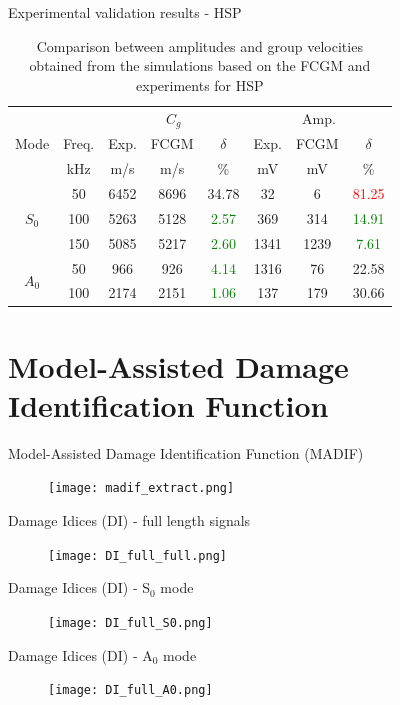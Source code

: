 \documentclass[10pt,aspectratio=169]{beamer} %
\begin{document}
\begin{frame}[label=frame16]{Experimental validation results - HSP}
	\begin{table}
		\centering
		\caption{\label{tab:group_velocity_hsp} Comparison between amplitudes and group velocities obtained from the simulations based on the FCGM and experiments for HSP}
		\begin{tabular}{cccccccc}
			\toprule
			& & \multicolumn{3}{c}{\(C_g\)} & \multicolumn{3}{c}{Amp.}\\
			Mode & Freq. & Exp. & FCGM & \(\delta\) & Exp. & FCGM & \(\delta\)\\
			& kHz & m/s & m/s & \% & mV & mV & \%\\
			\midrule
			\multirow{3}{*}{$S_0$} & 50 & 6452 & 8696 & {34.78}& 32 & 6 & \textcolor{red}{81.25}\\
			&100& 5263 & 5128 & \textcolor{green}{2.57}& 369 & 314 & \textcolor{green}{14.91}\\
			&150& 5085 & 5217 & \textcolor{green}{2.60}& 1341 & 1239 & \textcolor{green}{7.61}\\
			\midrule
			\multirow{2}{*}{$A_0$} & 50 & 966 & 926 & \textcolor{green}{4.14} & 1316& 76 & {22.58}\\
			& 100 & 2174 & 2151 & \textcolor{green}{1.06} & 137 & 179 & {30.66}\\
			\bottomrule
		\end{tabular}
	\end{table}
\end{frame}
\section{Model-Assisted Damage Identification Function}
\begin{frame}[label=frame17]{Model-Assisted Damage Identification Function (MADIF)}
\begin{figure}
	\texttt{[image: madif\_extract.png]}
	\label{fig:madif_ectract}
\end{figure}
\end{frame}

\begin{frame}[label=frame17]{Damage Idices (DI) - full length signals}
	\begin{figure}
		\texttt{[image: DI\_full\_full.png]}
		\label{fig:DI_full_full}
	\end{figure}
\end{frame}
\begin{frame}[label=frame17]{Damage Idices (DI) - S\(_0\) mode}
	\begin{figure}
		\texttt{[image: DI\_full\_S0.png]}
		\label{fig:DI_full_S0}
	\end{figure}
\end{frame}
\begin{frame}[label=frame17]{Damage Idices (DI) - A\(_0\) mode}
\begin{figure}
	\texttt{[image: DI\_full\_A0.png]}
	\label{fig:DI_full_A0}
\end{figure}
\end{frame}
\end{document}

